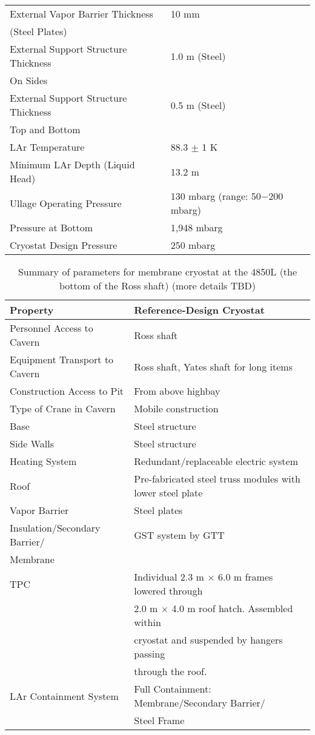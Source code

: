\begin{table}
\begin{tabular}[htbp]{|l| p{8cm} |}
\hline
External Vapor Barrier Thickness & 10 mm \\
(Steel Plates)                   &       \\
\hline
External Support Structure Thickness & 1.0 m (Steel) \\
On Sides & \\
\hline
External Support Structure Thickness & 0.5 m (Steel) \\
Top and Bottom & \\
\hline
LAr Temperature & 88.3 $\pm$ 1 K \\
\hline
Minimum LAr Depth (Liquid Head) & 13.2 m \\
\hline
Ullage Operating Pressure & 130 mbarg (range: 50$-$200 mbarg) \\
\hline
Pressure at Bottom & 1,948 mbarg \\
\hline 
Cryostat Design Pressure & 250 mbarg \\
\hline
\end{tabular} 
\end{table}


\begin{table}
\caption{Summary of parameters for membrane cryostat at the 4850L (the bottom of the Ross shaft) (more details TBD)} 
\label{table:cryo-reqs}
\begin{tabular}[htbp]{| p{}|p{}|}
\hline 
\textbf{Property} & \textbf{Reference-Design Cryostat}\\
\hline\hline
Personnel Access to Cavern & Ross shaft\\
\hline
Equipment Transport to Cavern & Ross shaft, Yates shaft for long items \\
\hline
Construction Access to Pit & From above highbay \\
\hline
Type of Crane in Cavern & Mobile construction \\
\hline
Base & Steel structure \\
\hline
Side Walls & Steel structure \\
\hline
Heating System & Redundant/replaceable electric system \\
\hline
Roof & Pre-fabricated steel truss modules with lower steel plate \\
\hline
Vapor Barrier & Steel plates  \\
\hline
Insulation/Secondary Barrier/ & GST system by GTT \\
Membrane & \\
\hline
TPC & Individual 2.3 m $\times$ 6.0 m frames lowered through \\
    & 2.0 m $\times$ 4.0 m roof hatch. Assembled within \\
    & cryostat and suspended by hangers passing \\
    & through the roof. \\
\hline
LAr Containment System & Full Containment: Membrane/Secondary Barrier/ \\
                       & Steel Frame \\
\hline
\end{tabular} 
\end{table}


